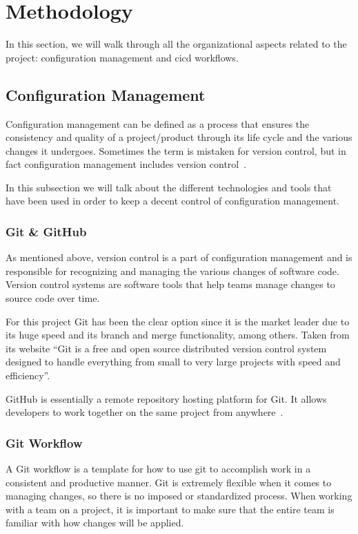 \chapter{Methodology}
\label{mt:methodology}

In this section, we will walk through all the organizational aspects related to the project: configuration management and \gls{cicd} workflows.

\section{Configuration Management}

Configuration management can be defined as a process that ensures the consistency and quality of a project/product through its life cycle and the various changes it undergoes. Sometimes the term is mistaken for version control, but in fact configuration management includes version control~\cite{hammond2012version}.

In this subsection we will talk about the different technologies and tools that have been used in order to keep a decent control of configuration management.

\subsection{Git \& GitHub}

As mentioned above, version control is a part of configuration management and is responsible for recognizing and managing the various changes of software code. Version control systems are software tools that help teams manage changes to source code over time. 

For this project Git has been the clear option since it is the market leader due to its huge speed and its branch and merge functionality, among others. Taken from its website \enquote{Git is a free and open source distributed version control system designed to handle everything from small to very large projects with speed and efficiency}.

GitHub is essentially a remote repository hosting platform for Git. It allows developers to work together on the same project from anywhere~\cite{chacon2014pro}.

\subsection{Git Workflow}

A Git workflow is a template for how to use git to accomplish work in a consistent and productive manner. Git is extremely flexible when it comes to managing changes, so there is no imposed or standardized process. When working with a team on a project, it is important to make sure that the entire team is familiar with how changes will be applied. 

